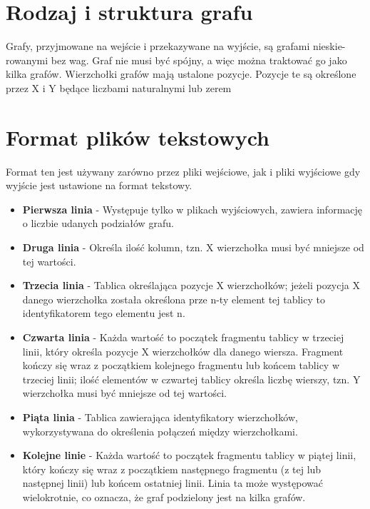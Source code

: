 \documentclass{article}
\begin{document}
\section{Rodzaj i struktura grafu}
Grafy, przyjmowane na wejście i przekazywane na wyjście, są grafami nieskie- rowanymi bez wag. Graf nie musi być spójny, a więc można traktować go jako kilka grafów. Wierzchołki grafów mają ustalone pozycje. Pozycje te są określone przez X i Y będące liczbami naturalnymi lub zerem
\section{Format plików tekstowych}
 Format ten jest używany zarówno przez pliki wejściowe, jak i pliki wyjściowe gdy wyjście jest ustawione na format tekstowy.
\begin{itemize}
    \item \textbf{Pierwsza linia} - Występuje tylko w plikach wyjściowych, zawiera informację o liczbie udanych podziałów grafu.
    \item \textbf{Druga linia} - Określa ilość kolumn, tzn. X wierzchołka musi być mniejsze od tej wartości.
    \item \textbf{Trzecia linia} - Tablica określająca pozycje X wierzchołków; jeżeli pozycja X danego wierzchołka została określona prze n-ty element tej tablicy to identyfikatorem tego elementu jest n.
    \item \textbf{Czwarta linia} - Każda wartość to początek fragmentu tablicy w trzeciej linii, który określa pozycje X wierzchołków dla danego wiersza. Fragment kończy się wraz z początkiem kolejnego fragmentu lub końcem tablicy w trzeciej linii; ilość elementów w czwartej tablicy określa liczbę wierszy, tzn. Y wierzchołka musi być mniejsze od tej wartości.
    \item \textbf{Piąta linia} - Tablica zawierająca identyfikatory wierzchołków, wykorzystywana do określenia połączeń między wierzchołkami.
    \item \textbf{Kolejne linie} - Każda wartość to początek fragmentu tablicy w piątej linii, który kończy się wraz z początkiem następnego fragmentu (z tej lub następnej linii) lub końcem ostatniej linii. Linia ta może występować wielokrotnie, co oznacza, że graf podzielony jest na kilka grafów.
\end{itemize}
\end{document}
